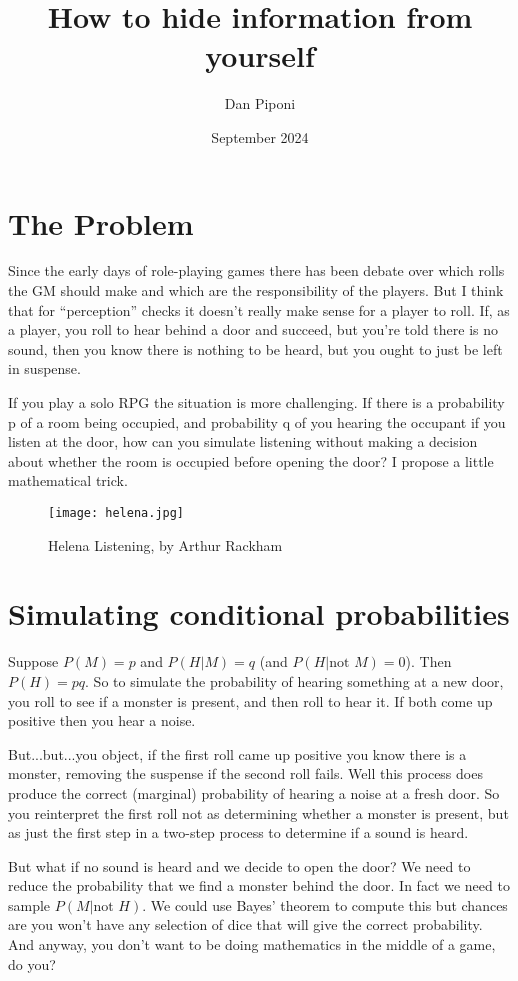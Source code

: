 \documentclass[12pt]{article}
\title{How to hide information from yourself}
\author{Dan Piponi}
\date{September 2024}
\begin{document}
\maketitle

\section{The Problem}
Since the early days of role-playing games there has been debate over which rolls the GM should make and which are the responsibility of the players.
But I think that for ``perception'' checks it doesn't really make sense for a player to roll.
If, as a player, you roll to hear behind a door and succeed, but you're told there is no sound, then you know there is nothing to be heard, but you ought to just be left in suspense.

If you play a solo RPG the situation is more challenging. If there is a probability p of a room being occupied, and probability q of you hearing the occupant if you listen at the door, how can you simulate listening without making a decision about whether the room is occupied before opening the door? I propose a little mathematical trick.

\begin{figure*}
\centering
\texttt{[image: helena.jpg]}
\caption{Helena Listening, by Arthur Rackham}
\end{figure*}

\section{Simulating conditional probabilities}
Suppose $P(M)=p$ and $P(H|M)=q$ (and $P(H|\mbox{not }M)=0$).
Then $P(H) = pq$.
So to simulate the probability of hearing something at a new door, you roll to see if a monster is present, and then roll to hear it.
If both come up positive then you hear a noise.

But...but...you object, if the first roll came up positive you know there is a monster, removing the suspense if the second roll fails.
Well this process does produce the correct (marginal) probability of hearing a noise at a fresh door.
So you reinterpret the first roll not as determining whether a monster is present, but as just the first step in a two-step process to determine if a sound is heard.

But what if no sound is heard and we decide to open the door?
We need to reduce the probability that we find a monster behind the door.
In fact we need to sample $P(M|\mbox{not }H)$.
We could use Bayes' theorem to compute this but chances are you won't have any selection of dice that will give the correct probability.
And anyway, you don't want to be doing mathematics in the middle of a game, do you?
\end{document}

